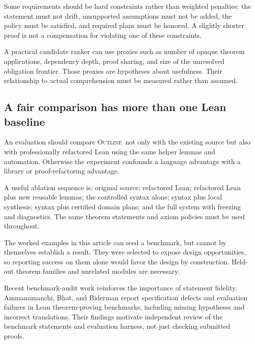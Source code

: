 \documentclass[11pt,a4paper]{article}
\newcommand{\Outline}{\textsc{Outline}}
\theoremstyle{definition}
\theoremstyle{remark}
\numberwithin{equation}{section}
\begin{document}
Some requirements should be hard constraints rather than weighted penalties: the statement must not drift, unsupported assumptions must not be added, the policy must be satisfied, and required plans must be honored. A slightly shorter proof is not a compensation for violating one of these constraints.

A practical candidate ranker can use proxies such as number of opaque theorem applications, dependency depth, proof sharing, and size of the unresolved obligation frontier. Those proxies are hypotheses about usefulness. Their relationship to actual comprehension must be measured rather than assumed.

\subsection{A fair comparison has more than one Lean baseline}
An evaluation should compare \Outline\ not only with the existing source but also with professionally refactored Lean using the same helper lemmas and automation. Otherwise the experiment confounds a language advantage with a library or proof-refactoring advantage.

A useful ablation sequence is: original source; refactored Lean; refactored Lean plus new reusable lemmas; the controlled syntax alone; syntax plus local synthesis; syntax plus certified domain plans; and the full system with freezing and diagnostics. The same theorem statements and axiom policies must be used throughout.

The worked examples in this article can seed a benchmark, but cannot by themselves establish a result. They were selected to expose design opportunities, so reporting success on them alone would favor the design by construction. Held-out theorem families and unrelated modules are necessary.

Recent benchmark-audit work reinforces the importance of statement fidelity. Ammanamanchi, Bhat, and Biderman report specification defects and evaluation failures in Lean theorem-proving benchmarks, including missing hypotheses and incorrect translations. Their findings motivate independent review of the benchmark statements and evaluation harness, not just checking submitted proofs.\cite{benchmark-faults}
\end{document}
